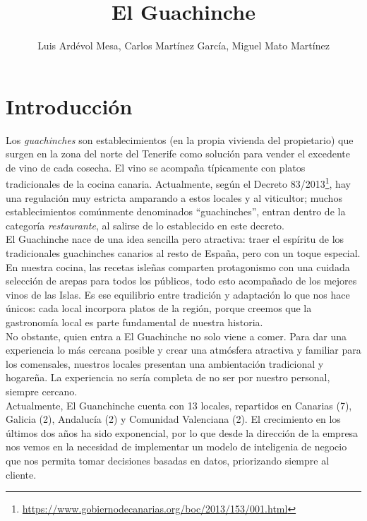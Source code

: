 \documentclass[11pt]{opticajnl}
\title{El Guachinche}
\author[1,2,3]{Luis Ardévol Mesa, Carlos Martínez García, Miguel Mato Martínez}
\begin{document}
\maketitle

\tableofcontents

\hrulefill

\section{Introducción}

Los \textit{guachinches} son establecimientos (en la propia vivienda del propietario) que surgen en la zona del norte del Tenerife como solución para vender el excedente de vino de cada cosecha. El vino se acompaña típicamente con platos tradicionales de la cocina canaria. Actualmente, según el Decreto 83/2013\footnote{\url{https://www.gobiernodecanarias.org/boc/2013/153/001.html}}, hay una regulación muy estricta amparando a estos locales y al viticultor; muchos establecimientos comúnmente denominados ``guachinches'', entran dentro de la categoría \textit{restaurante}, al salirse de lo establecido en este decreto. \\

El Guachinche nace de una idea sencilla pero atractiva: traer el espíritu de los tradicionales guachinches canarios al resto de España, pero con un toque especial. En nuestra cocina, las recetas isleñas comparten protagonismo con una cuidada selección de arepas para todos los públicos, todo esto acompañado de los mejores vinos de las Islas. Es ese equilibrio entre tradición y adaptación lo que nos hace únicos: cada local incorpora platos de la región, porque creemos que la gastronomía local es parte fundamental de nuestra historia. \\

No obstante, quien entra a El Guachinche no solo viene a comer. Para dar una experiencia lo más cercana posible y crear una atmósfera atractiva y familiar para los comensales, nuestros locales presentan una ambientación tradicional y hogareña. La experiencia no sería completa de no ser por nuestro personal, siempre cercano. \\

Actualmente, El Guanchinche cuenta con 13 locales, repartidos en Canarias (7), Galicia (2), Andalucía (2) y Comunidad Valenciana (2). El crecimiento en los últimos dos años ha sido exponencial, por lo que desde la dirección de la empresa nos vemos en la necesidad de implementar un modelo de inteligenia de negocio que nos permita tomar decisiones basadas en datos, priorizando siempre al cliente. \\
\end{document}
